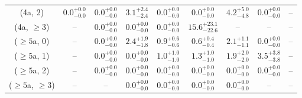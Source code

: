 \begin{table}[h!]
{\begin{tabular}{ccccccccc}
	(4a, 2) & $0.0^{+ 0.0 }_{- 0.0 }$ & $0.0^{+ 0.0 }_{- 0.0 }$ & $3.1^{+ 2.4 }_{- 2.4 }$ & $0.0^{+ 0.0 }_{- 0.0 }$ & $0.0^{+ 0.0 }_{- 0.0 }$ & $4.2^{+ 5.0 }_{- 4.8 }$ & $0.0^{+ 0.0 }_{- 0.0 }$ & -- \\[0.5ex] 
	(4a, $\ge3$) & -- & $0.0^{+ 0.0 }_{- 0.0 }$ & $0.0^{+ 0.0 }_{- 0.0 }$ & $0.0^{+ 0.0 }_{- 0.0 }$ & $15.6^{+ 23.1 }_{- 22.6 }$ & -- & -- & -- \\[0.5ex] 
	($\ge5$a, 0) & -- & $0.0^{+ 0.0 }_{- 0.0 }$ & $2.4^{+ 1.9 }_{- 1.8 }$ & $0.9^{+ 0.6 }_{- 0.6 }$ & $0.6^{+ 0.4 }_{- 0.4 }$ & $2.1^{+ 1.1 }_{- 1.1 }$ & $0.0^{+ 0.0 }_{- 0.0 }$ & -- \\[0.5ex] 
	($\ge5$a, 1) & -- & $0.0^{+ 0.0 }_{- 0.0 }$ & $0.0^{+ 0.0 }_{- 0.0 }$ & $1.0^{+ 1.0 }_{- 1.0 }$ & $1.3^{+ 1.0 }_{- 1.0 }$ & $1.9^{+ 2.0 }_{- 2.0 }$ & $3.5^{+ 3.8 }_{- 3.8 }$ & -- \\[0.5ex] 
	($\ge5$a, 2) & -- & $0.0^{+ 0.0 }_{- 0.0 }$ & $0.0^{+ 0.0 }_{- 0.0 }$ & $0.0^{+ 0.0 }_{- 0.0 }$ & $0.0^{+ 0.0 }_{- 0.0 }$ & $0.0^{+ 0.0 }_{- 0.0 }$ & $0.0^{+ 0.0 }_{- 0.0 }$ & -- \\[0.5ex] 
	($\ge5$a, $\ge3$) & -- & -- & $0.0^{+ 0.0 }_{- 0.0 }$ & $0.0^{+ 0.0 }_{- 0.0 }$ & $0.0^{+ 0.0 }_{- 0.0 }$ & $0.0^{+ 0.0 }_{- 0.0 }$ & -- & -- \\[0.5ex] 
	\hline
	\hline
\end{tabular}}
\end{table}
